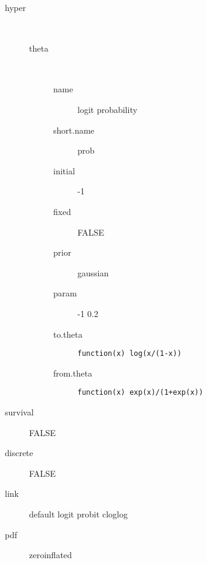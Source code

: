 \begin{description}
	\item[hyper]\ 
	 \begin{description}
	 	\item[theta]\ 
	 	 \begin{description}
	 	 	 \item[ name ] logit probability 
	 	 	 \item[ short.name ] prob 
	 	 	 \item[ initial ] -1 
	 	 	 \item[ fixed ] FALSE 
	 	 	 \item[ prior ] gaussian 
	 	 	 \item[ param ] -1 0.2 
	 	 	 \item[ to.theta ] \verb|function(x) log(x/(1-x))| 
	 	 	 \item[ from.theta ] \verb|function(x) exp(x)/(1+exp(x))| 
	 	 \end{description}
	 \end{description}
	 \item[ survival ] FALSE 
	 \item[ discrete ] FALSE 
	 \item[ link ] default logit probit cloglog 
	 \item[ pdf ] zeroinflated 
\end{description}
